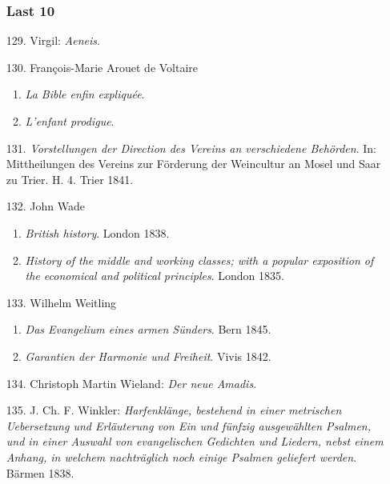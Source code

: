 \begin{enumerate}

\subsubsection*{Last 10}

\item[129.] Virgil: \textit{Aeneis}.

\item[130.] François-Marie Arouet de Voltaire
\begin{enumerate}
    \item \textit{La Bible enfin expliquée}.
    \item \textit{L'enfant prodigue}.
\end{enumerate}

\item[131.] \textit{Vorstellungen der Direction des Vereins an verschiedene Behörden}. In: Mittheilungen des Vereins
zur Förderung der Weincultur an Mosel und Saar zu Trier. H. 4. Trier 1841.

\item[132.] John Wade
\begin{enumerate}
    \item \textit{British history}. London 1838.
    \item \textit{History of the middle and working classes; with a popular exposition of the economical and political principles}. London 1835.
\end{enumerate}

\item[133.] Wilhelm Weitling
\begin{enumerate}
    \item \textit{Das Evangelium eines armen Sünders}. Bern 1845.
    \item \textit{Garantien der Harmonie und Freiheit}. Vivis 1842.
\end{enumerate}

\item[134.] Christoph Martin Wieland: \textit{Der neue Amadis}.

\item[135.] J. Ch. F. Winkler: \textit{Harfenklänge, bestehend in einer metrischen Uebersetzung und Erläuterung von Ein und fünfzig ausgewählten Psalmen, und in einer Auswahl von evangelischen Gedichten und Liedern, nebst einem Anhang, in welchem nachträglich noch einige Psalmen geliefert werden}. Bärmen 1838.


\end{enumerate}
